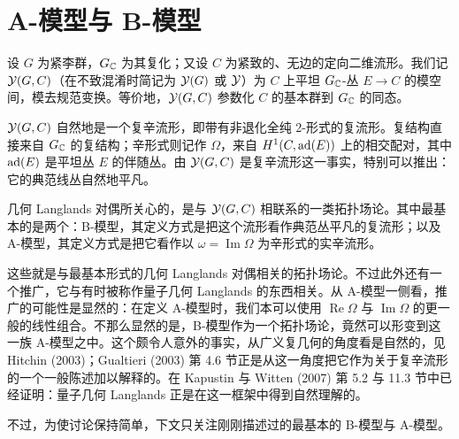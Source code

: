 \section{A-模型与 B-模型}

设 $G$ 为紧李群，$G_{\mathbb{C}}$ 为其复化；又设 $C$ 为紧致的、无边的定向二维流形。我们记 $\mathcal{Y}(G,C)$（在不致混淆时简记为 $\mathcal{Y}(G)$ 或 $\mathcal{Y}$）为 $C$ 上平坦 $G_{\mathbb{C}}$-丛 $E\to C$ 的模空间，模去规范变换。等价地，$\mathcal{Y}(G,C)$ 参数化 $C$ 的基本群到 $G_{\mathbb{C}}$ 的同态。

$\mathcal{Y}(G,C)$ 自然地是一个复辛流形，即带有非退化全纯 2-形式的复流形。复结构直接来自 $G_{\mathbb{C}}$ 的复结构；辛形式则记作 $\Omega$，来自 $H^{1}(C,\operatorname{ad}(E))$ 上的相交配对，其中 $\operatorname{ad}(E)$ 是平坦丛 $E$ 的伴随丛。由 $\mathcal{Y}(G,C)$ 是复辛流形这一事实，特别可以推出：它的典范线丛自然地平凡。

几何 Langlands 对偶所关心的，是与 $\mathcal{Y}(G,C)$ 相联系的一类拓扑场论。其中最基本的是两个：B-模型，其定义方式是把这个流形看作典范丛平凡的复流形；以及 A-模型，其定义方式是把它看作以 $\omega=\operatorname{Im}\Omega$ 为辛形式的实辛流形。

这些就是与最基本形式的几何 Langlands 对偶相关的拓扑场论。不过此外还有一个推广，它与有时被称作量子几何 Langlands 的东西相关。从 A-模型一侧看，推广的可能性是显然的：在定义 A-模型时，我们本可以使用 $\operatorname{Re}\Omega$ 与 $\operatorname{Im}\Omega$ 的更一般的线性组合。不那么显然的是，B-模型作为一个拓扑场论，竟然可以形变到这一族 A-模型之中。这个颇令人意外的事实，从广义复几何的角度看是自然的，见 Hitchin (2003)；Gualtieri (2003) 第 4.6 节正是从这一角度把它作为关于复辛流形的一个一般陈述加以解释的。在 Kapustin 与 Witten (2007) 第 5.2 与 11.3 节中已经证明：量子几何 Langlands 正是在这一框架中得到自然理解的。

不过，为使讨论保持简单，下文只关注刚刚描述过的最基本的 B-模型与 A-模型。
